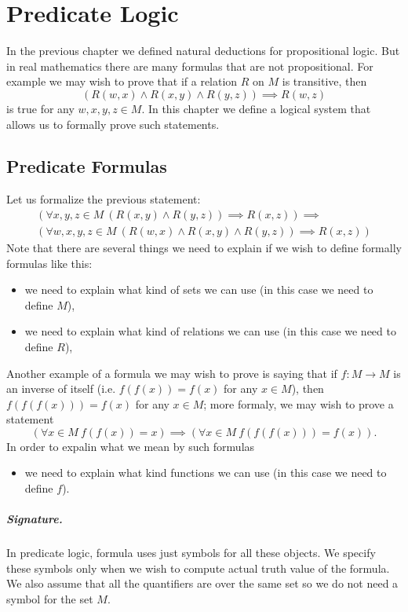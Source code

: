\chapter{Predicate Logic}
In the previous chapter we defined natural deductions for propositional logic.
But in real mathematics there are many formulas that are not propositional. For
example we may wish to prove that if a relation $R$ on $M$ is transitive, then
\[
  (R(w, x) \land R(x, y) \land R(y, z)) \implies R(w, z)
\]
is true for any $w, x, y, z \in M$. In this chapter we define a logical
system that allows us to formally prove such statements.

\section{Predicate Formulas}
Let us formalize the previous statement:
\begin{multline*}
  (\forall x, y, z \in M ~ (R(x, y) \land R(y, z)) \implies R(x, z)) \implies \\
  (\forall w, x, y, z \in M ~ (R(w, x) \land R(x, y) \land R(y, z)) \implies
  R(x, z))
\end{multline*}
Note that there are several things we need to explain if we wish to define
formally formulas like this:
\begin{itemize}
  \item we need to explain what kind of sets we can use (in this case we need
    to define $M$),
  \item we need to explain what kind of relations we can use (in this case we
    need to define $R$),
\end{itemize}

Another example of a formula we may wish to prove is saying that if
$f : M \to M$ is an inverse of itself (i.e. $f(f(x)) = f(x)$ for any $x \in M$),
then $f(f(f(x))) = f(x)$ for any $x \in M$; more formaly, we may wish to prove a
statement
\[
  (\forall x \in M ~ f(f(x)) = x) \implies
    (\forall x \in M ~ f(f(f(x))) = f(x)).
\]
In order to expalin what we mean by such formulas
\begin{itemize}
  \item we need to explain what kind functions we can use (in this case we need
    to define $f$).
\end{itemize}

\paragraph{Signature.}
In predicate logic, formula uses just symbols for all these objects. We specify
these symbols only when we wish to compute actual truth value of the formula.
We also assume that all the quantifiers are over the same set so we do not need
a symbol for the set $M$.

